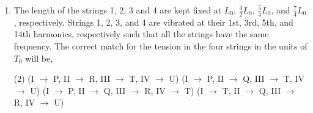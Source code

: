 
\begin{enumerate}
    \item The length of the strings 1, 2, 3 and 4 are kept fixed at $L_0$, $\frac{3}{2}L_0$, $\frac{5}{4}L_0$, and $\frac{7}{4}L_0$, respectively. Strings 1, 2, 3, and 4 are vibrated at their 1st, 3rd, 5th, and 14th harmonics, respectively such that all the strings have the same frequency. The correct match for the tension in the four strings in the units of $T_0$ will be,
        \begin{tasks}(2)
            \task(I $\rightarrow$ P, II $\rightarrow$ R, III $\rightarrow$ T, IV $\rightarrow$ U)
            \task(I $\rightarrow$ P, II $\rightarrow$ Q, III $\rightarrow$ T, IV $\rightarrow$ U)
            \task(I $\rightarrow$ P, II $\rightarrow$ Q, III $\rightarrow$ R, IV $\rightarrow$ T)
            \task(I $\rightarrow$ T, II $\rightarrow$ Q, III $\rightarrow$ R, IV $\rightarrow$ U)
        \end{tasks}
\end{enumerate}
